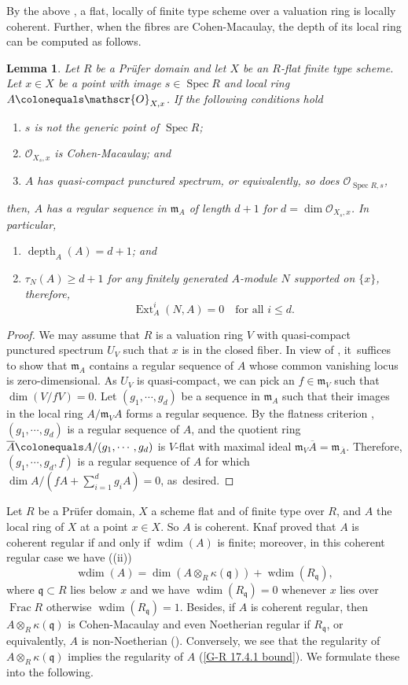 \documentclass[JEP,XML,SOM,Unicode,published]{cedram}
\newenvironment{enumeratei}
{\bgroup\def\theenumi{\roman{enumi}}\def\theenumii{\arabic{enumii}}\begin{enumerate}}
{\end{enumerate}\egroup}
\newenvironment{enumeratea}
{\bgroup\def\theenumi{\alph{enumi}}\begin{enumerate}}
{\end{enumerate}\egroup}
\newcommand{\fm}{\mathfrak{m}}
\newcommand{\fq}{\mathfrak{q}}
\newcommand{\sO}{\mathscr{O}}
\let\ce\colonequals
\let\q\quad
\DeclareMathOperator{\Spec}{Spec}
\DeclareMathOperator{\wdim}{wdim}
\DeclareMathOperator{\Frac}{Frac}
\DeclareMathOperator{\depth}{depth}
\DeclareMathOperator{\Ext}{Ext}
\newcommand{\bpf}{\begin{proof}}
\newcommand{\epf}{\end{proof}}
\newcommand{\blem}{\begin{lemma}}
\newcommand{\elem}{\end{lemma}}
\newcommand{\benum}{\begin{enumeratea}}
\newcommand{\benumr}{\begin{enumeratei}}
\newcommand{\eenum}{\end{enumeratea}}
\newcommand{\eenumr}{\end{enumeratei}}
\theoremstyle{plain}
\newtheorem{lemma}[subsection]{Lemma}
\theoremstyle{definition}
\begin{document}
By the above , a flat, locally of finite type scheme over a valuation ring is locally coherent.
Further, when the fibres are Cohen-Macaulay, the depth of its local ring can be computed as follows.
\blem \label{depth of O_{X,x}}
Let $R$ be a Prüfer domain and let $X$ be an $R$-flat finite type scheme.
Let $x\in X$ be a point with image $s\in \Spec R$ and local ring $A\ce \sO_{X,x}$.
If the following conditions hold
\benum
\item $s$ is not the generic point of $\Spec R$;
\item $\sO_{X_s,x}$ is Cohen-Macaulay; and
\item $A$ has quasi-compact punctured spectrum, or equivalently, so does $\sO_{\Spec R,s}$,
\eenum
\noindent
then, $A$ has a regular sequence in $\fm_A$ of length $d+1$ for $d=\dim \sO_{X_s,x}$. In particular,
\benumr
\item \label{depth of A} $\depth_A(A)=d+1$; and
\item $\tau_N(A)\ge d+1$ for any finitely generated $A$\nobreakdash-mod\-ule $N$ supported on $\{x\}$, therefore,
\[
\Ext_A^i(N,A)=0\q \text{for all }i\le d.
\]
\eenumr
\elem
\bpf
We may assume that $R$ is a valuation ring $V$ with quasi-compact punctured spectrum $U_V$ such that $x$ is in the closed fiber.
In view of , it~suffices to show that $\fm_A$ contains a regular sequence of $A$ whose common vanishing locus is zero-dimensional.
As $U_V$ is quasi-compact, we can pick an $f\!\in\! \mathfrak{m}_V$ such that \hbox{$\dim (V/fV) \!=\!0$}.
Let $(g_1,\cdots, g_d)$ be a sequence in $\fm_A$ such that their images in the local ring $A/\mathfrak{m}_VA$ forms a regular sequence.
By the flatness criterion \cite[Th.\,11.3.8]{EGAIV3}, $(g_1,\cdots, g_d)$ is a regular sequence of $A$, and the quotient ring $\overline{A}\ce A/(g_1,\cdots, g_d)$ is $V$-flat with maximal ideal $\mathfrak{m}_V\overline{A}= \mathfrak{m}_{\overline{A}}$. Therefore, $(g_1,\cdots, g_d,f)$ is a regular sequence of $A$ for which $\dim A/(fA+\sum_{i=1}^dg_iA) =0$, as~desired.
\epf

Let $R$ be a Prüfer domain, $X$ a scheme flat and of finite type over $R$, and $A$ the local ring of $X$ at a point $x\in X$.
So $A$ is coherent.
Knaf proved \cite[Th.\,1.1]{Kna08} that $A$ is coherent regular if and only if $\wdim(A)$ is finite; moreover, in this coherent regular case we have (\cf {}(ii))
\[
\wdim(A)=\dim (A\otimes_R \kappa(\fq))+\wdim(R_{\fq}),
\]
where $\fq\subset R$ lies below $x$ and we have $\wdim(R_{\fq})=0$ whenever $x$ lies over $\Frac R$ otherwise $\wdim(R_{\fq})=1$.
Besides, if $A$ is coherent regular, then $A\otimes_R \kappa(\fq)$ is Cohen-Macaulay and even Noetherian regular if $R_{\fq}$, or equivalently, $A$ is non-Noetherian (\cite[Th.\,1.3]{Kna08}). Conversely, we see that the regularity of $A\otimes_R \kappa(\fq)$ implies the regularity of $A$ (\cf {}\eqref{G-R 17.4.1 bound}).
We formulate these into the following.
\end{document}
